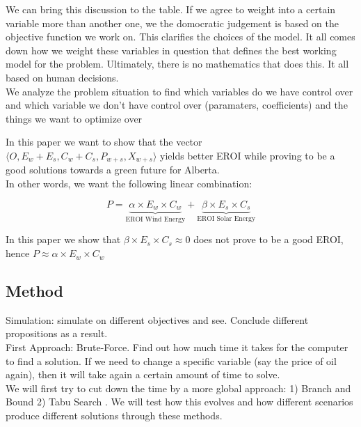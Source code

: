 \documentclass[12pt]{article}
\begin{document}
We can bring this discussion to the table. If we agree to weight into a certain variable more than another one, we the domocratic judgement is based on the objective function we work on. This clarifies the choices of the model. It all comes down how we weight these variables in question that defines the best working model for the problem. Ultimately, there is no mathematics that does this. It all based on human decisions. \\

We analyze the problem situation to find which variables do we have control over and which variable we don't have control over (paramaters, coefficients) and the things we want to optimize over

In this paper we want to show that the vector $\langle O, E_{w} + E_{s}, C_{w} + C_{s}, P_{w+s}, X_{w+s}\rangle$ yields better EROI while proving to be a good solutions towards a green future for Alberta. \\

In other words, we want the following linear combination:

\begin{displaymath}
P = \underbrace{\alpha \times E_w \times C_w}_\text{EROI Wind Energy} + \underbrace{ \beta \times E_s \times C_s}_\text{EROI Solar Energy}
\end{displaymath}

In this paper we show that $\beta \times E_s \times C_s \approx 0$ does not prove to be a good EROI, hence $P \approx \alpha \times E_w \times C_w $\\

\subsection{Method}
Simulation: simulate on different objectives and see. Conclude different propositions as a result. \\

First Approach: Brute-Force. Find out how much time it takes for the computer to find a solution. If we need to change a specific variable (say the price of oil again), then it will take again a certain amount of time to solve. \\

We will first try to cut down the time by a more global approach: 1) Branch and Bound 2) Tabu Search . We will test how this evolves and how different scenarios produce different solutions through these methods.  \\
\end{document}
